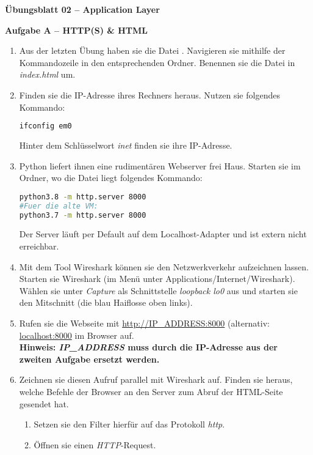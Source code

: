 \documentclass[paper=a4,fontsize=11pt]{scrartcl}%
\numberwithin{equation}{section}
\begin{document}
\begin{center}
\Large{\textbf{Übungsblatt 02 --  Application Layer}}
\end{center}

\begin{center}\Large{\textbf{Aufgabe A -- HTTP(S) \& HTML}}\end{center}\vskip0.25in
\begin{enumerate}
	\item Aus der letzten Übung haben sie die Datei . Navigieren sie mithilfe der Kommandozeile in den entsprechenden Ordner. Benennen sie die Datei in \emph{index.html} um.
	\item Finden sie die IP-Adresse ihres Rechners heraus. Nutzen sie folgendes Kommando:
		\begin{lstlisting}[style=Bash, language=Bash]
ifconfig em0
\end{lstlisting}
		Hinter dem Schlüsselwort \emph{inet} finden sie ihre IP-Adresse.
	\item Python liefert ihnen eine rudimentären Webserver frei Haus. Starten sie im Ordner, wo die  Datei liegt folgendes Kommando:
		\begin{lstlisting}[style=Bash, language=Bash]
python3.8 -m http.server 8000
#Fuer die alte VM:
python3.7 -m http.server 8000
		\end{lstlisting}
		Der Server läuft per Default auf dem Localhost-Adapter und ist extern nicht erreichbar.
	\item Mit dem Tool Wireshark können sie den Netzwerkverkehr aufzeichnen lassen. Starten sie Wireshark (im Menü unter Applications/Internet/Wireshark). Wählen sie unter \emph{Capture} als Schnittstelle \emph{loopback lo0} aus und starten sie den Mitschnitt (die blau Haiflosse oben links).
	\item Rufen sie die Webseite mit \url{http://IP_ADDRESS:8000} (alternativ: \url{localhost:8000} im Browser auf. \\ \textbf{Hinweis: \textit{IP\_ADDRESS} muss durch die IP-Adresse aus der zweiten Aufgabe ersetzt werden.}
	\item Zeichnen sie diesen Aufruf parallel mit Wireshark auf. Finden sie heraus, welche Befehle der Browser an den Server zum  Abruf der HTML-Seite gesendet hat.
	\begin{enumerate}
		\item Setzen sie den Filter hierfür auf das Protokoll \emph{http}.
		\item Öffnen sie einen \emph{HTTP}-Request.

\end{enumerate}
\end{enumerate}
\end{document}
